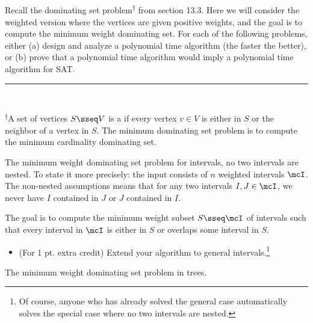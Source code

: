 \documentclass{article}
\begin{document}
\setcounter{section}{13}
\setcounter{exercise}{6}
 Recall the dominating set problem\textsuperscript{\hyperref[fn:dmset]{$\dagger$}} from section 13.3.
  Here we will consider the weighted version where the vertices are given positive weights, and the goal is to compute the minimum weight dominating set.
  For each of the following problems, either (a) design and analyze a polynomial time algorithm (the faster the better), or (b) prove that a polynomial time algorithm would imply a polynomial time algorithm for SAT. \\
\noindent\rule{2in}{0.4pt} \\
\parbox{\linewidth}{\small \textsuperscript{\label{fn:dmset}$\dagger$}A set of vertices $S \sseq V$ is a  if every vertex $v \in V$ is either in $S$ or the neighbor of a vertex in $S$.
  The minimum dominating set problem is to compute the minimum cardinality dominating set.}

\begin{subexercise}
  The minimum weight dominating set problem for intervals,  no two intervals are nested.
  To state it more precisely: the input consists of $ n $ weighted intervals $ \mcI $.
  The non-nested assumptions means that for any two intervals $ I, J \in \mcI $, we never have $ I $ contained in $ J $ or $ J $ contained in $ I $.

  The goal is to compute the minimum weight subset $ S \sseq \mcI $ of intervals such that every interval in $ \mcI $ is either in $ S $ or overlaps some interval in $ S $.
\begin{itemize}
  \item (For 1 pt. extra credit) Extend your algorithm to general intervals.\footnote[8]{Of course, anyone who has already solved the general case automatically solves the special case where no two intervals are nested.}
\end{itemize}
\end{subexercise}

\begin{solution}

\end{solution}
\pagebreak

\begin{subexercise}
  The minimum weight dominating set problem in trees.
\end{subexercise}

\begin{solution}

\end{solution}
\pagebreak
\end{document}
